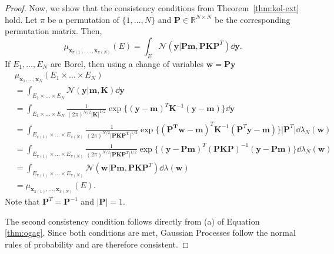 \begin{proof}
    Now, we show that the consistency conditions from Theorem~\ref{thm:kol-ext} hold.
    Let $\pi$ be a permutation of $\{ 1, \dots, N \}$ and $\mathbf{P} \in \mathbb{R}^{N \times N}$ be the corresponding permutation matrix.
    Then,
    \begin{equation*}
        \mu_{\mathbf{x}_{\pi(1)}, \dots, \mathbf{x}_{\pi(N)}}(E) =
        \int_{E} \mathcal{N}(\mathbf{y} | \mathbf{Pm}, \mathbf{P} \mathbf{K} \mathbf{P}^{T}) \dd \mathbf{y}.
    \end{equation*}
    If $E_1, \dots, E_N$ are Borel, then using a change of variables $\mathbf{w} = \mathbf{Py}$
    \begin{align*}
        & \mu_{\mathbf{x}_1, \dots, \mathbf{x}_N}(E_1 \times \dots \times E_N) \\
        & = \int_{E_1 \times \dots \times E_N} \mathcal{N}(\mathbf{y} | \mathbf{m}, \mathbf{K}) \dd \mathbf{y} \\
        & = \int_{E_1 \times \dots \times E_N}
        \frac{ 1 }{ (2 \pi)^{N/2} \lvert \mathbf{K} \rvert^{1/2} }
        \exp \{ (\mathbf{y} - \mathbf{m})^{T} \mathbf{K}^{-1} (\mathbf{y} - \mathbf{m}) \}
        \dd \mathbf{y} \\
        & = \int_{E_{\pi(1)} \times \dots \times E_{\pi(N)}}
        \frac{ 1 }{ (2 \pi)^{N/2} \lvert \mathbf{PKP^T} \rvert^{1/2} }
        \exp \{ (\mathbf{P^Tw} - \mathbf{m})^{T} \mathbf{K}^{-1} (\mathbf{P}^{T}\mathbf{y} - \mathbf{m}) \}
        \lvert \mathbf{P}^{T} \rvert \dd \lambda_N(\mathbf{w}) \\
        & = \int_{E_{\pi(1)} \times \dots \times E_{\pi(N)}}
        \frac{ 1 }{ (2 \pi)^{N/2} \lvert \mathbf{PKP}^T \rvert^{1/2} }
        \exp \{ (\mathbf{y} - \mathbf{Pm})^{T} (\mathbf{P}\mathbf{K} \mathbf{P})^{-1} (\mathbf{y} - \mathbf{P}\mathbf{m}) \} \dd \lambda_N(\mathbf{w}) \\
        & = \int_{E_{\pi(1)} \times \dots \times E_{\pi(N)}}
        \mathcal{N}(\mathbf{w} | \mathbf{Pm}, \mathbf{P} \mathbf{K} \mathbf{P}^{T}) \dd \lambda(\mathbf{w}) \\
        &= \mu_{\mathbf{x}_{\pi(1)}, \dots, \mathbf{x}_{\pi(N)}}(E).
    \end{align*}
    Note that $\mathbf{P}^{T} = \mathbf{P}^{-1}$ and $\lvert \mathbf{P} \rvert = 1$.

    The second consistency condition follows directly from (a) of Equation \ref{thm:ogag}.
    Since both conditions are met, Gaussian Processes follow the normal rules of probability and are therefore consistent.
\end{proof}



